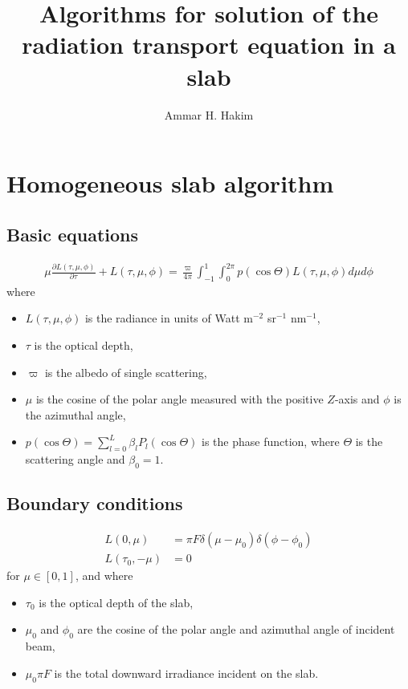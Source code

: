 \documentclass[11pt]{article}
\title{Algorithms for solution of the radiation transport equation in%
  a slab}
\author{Ammar H. Hakim}
\date{}
\newcommand{\pfrac}[2]{\frac{\partial #1}{\partial #2}}
\begin{document}
\maketitle

\section{Homogeneous slab algorithm}


\subsection{Basic equations}
\begin{align}
  \mu\pfrac{L(\tau,\mu,\phi)}{\tau} + L(\tau,\mu,\phi)
  =
  \frac{\varpi}{4\pi}
  \int_{-1}^1 \int_0^{2\pi}
  p(\cos\Theta) L(\tau,\mu,\phi) d\mu d\phi
\end{align}
where
\begin{itemize}
\item $L(\tau,\mu,\phi)$ is the radiance in units of Watt m$^{-2}$
  sr$^{-1}$ nm$^{-1}$,
\item $\tau$ is the optical depth,
\item $\varpi$ is the albedo of single scattering,
\item $\mu$ is the cosine of the polar angle measured with the
  positive $Z$-axis and $\phi$ is the azimuthal angle,
\item $p(\cos\Theta) = \sum_{l=0}^L\beta_lP_l(\cos\Theta)$ is the
  phase function, where $\Theta$ is the scattering angle and
  $\beta_0=1$.
\end{itemize}




\subsection{Boundary conditions}
\begin{align}
  L(0, \mu) &= \pi F \delta(\mu-\mu_0) \delta(\phi-\phi_0) \\
  L(\tau_0, -\mu) &= 0
\end{align}
for $\mu\in [0,1]$, and where
\begin{itemize}
\item $\tau_0$ is the optical depth of the slab,
\item $\mu_0$ and $\phi_0$ are the cosine of the polar angle and
  azimuthal angle of incident beam,
\item $\mu_0\pi F$ is the total downward irradiance incident on the
  slab.
\end{itemize}
\end{document}
